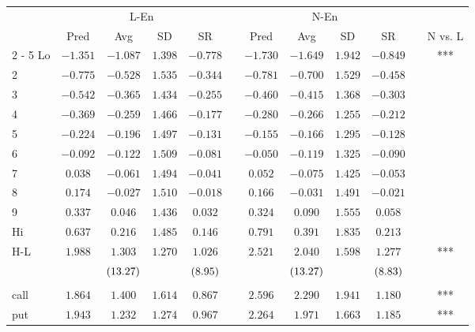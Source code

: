 \begin{tabular}{@{}lccccccccccc@{}}%
\toprule%
&\multicolumn{4}{c}{L{-}En}&&\multicolumn{4}{c}{N{-}En}&&\\%
\multicolumn{1}{c}{}&\multicolumn{1}{c}{Pred}&\multicolumn{1}{c}{Avg}&\multicolumn{1}{c}{SD}&\multicolumn{1}{c}{SR}&\multicolumn{1}{c}{}&\multicolumn{1}{c}{Pred}&\multicolumn{1}{c}{Avg}&\multicolumn{1}{c}{SD}&\multicolumn{1}{c}{SR}&\multicolumn{1}{c}{}&\multicolumn{1}{c}{N vs. L}\\%
\cmidrule{2%
-%
5}%
\cmidrule{7%
-%
10}%
\cmidrule{12%
-%
12}%
Lo&$-1.351$&$-1.087$&$1.398$&$-0.778$&&$-1.730$&$-1.649$&$1.942$&$-0.849$&&***\\%
2&$-0.775$&$-0.528$&$1.535$&$-0.344$&&$-0.781$&$-0.700$&$1.529$&$-0.458$&&\\%
3&$-0.542$&$-0.365$&$1.434$&$-0.255$&&$-0.460$&$-0.415$&$1.368$&$-0.303$&&\\%
4&$-0.369$&$-0.259$&$1.466$&$-0.177$&&$-0.280$&$-0.266$&$1.255$&$-0.212$&&\\%
5&$-0.224$&$-0.196$&$1.497$&$-0.131$&&$-0.155$&$-0.166$&$1.295$&$-0.128$&&\\%
6&$-0.092$&$-0.122$&$1.509$&$-0.081$&&$-0.050$&$-0.119$&$1.325$&$-0.090$&&\\%
7&$0.038$&$-0.061$&$1.494$&$-0.041$&&$0.052$&$-0.075$&$1.425$&$-0.053$&&\\%
8&$0.174$&$-0.027$&$1.510$&$-0.018$&&$0.166$&$-0.031$&$1.491$&$-0.021$&&\\%
9&$0.337$&$0.046$&$1.436$&$0.032$&&$0.324$&$0.090$&$1.555$&$0.058$&&\\%
Hi&$0.637$&$0.216$&$1.485$&$0.146$&&$0.791$&$0.391$&$1.835$&$0.213$&&\\%
\midrule%
H{-}L&$1.988$&$1.303$&$1.270$&$1.026$&&$2.521$&$2.040$&$1.598$&$1.277$&&***\\%
&&$\footnotesize{(13.27)}$&&$\footnotesize{(8.95)}$&&&$\footnotesize{(13.27)}$&&$\footnotesize{(8.83)}$&&\\%
&&&&&&&&&&&\\%
call&$1.864$&$1.400$&$1.614$&$0.867$&&$2.596$&$2.290$&$1.941$&$1.180$&&***\\%
put&$1.943$&$1.232$&$1.274$&$0.967$&&$2.264$&$1.971$&$1.663$&$1.185$&&***\\\bottomrule%
%
\end{tabular}